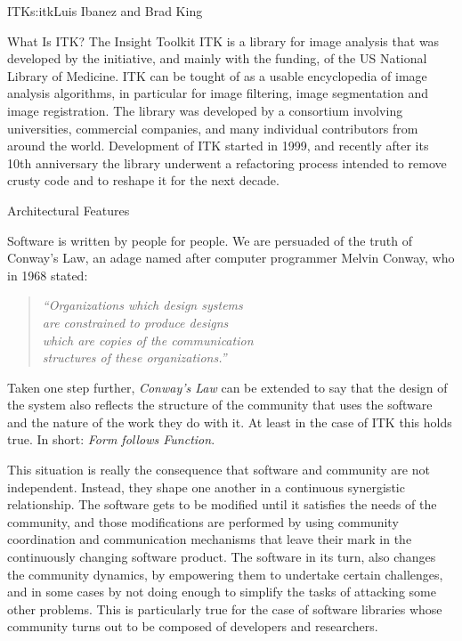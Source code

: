 \begin{aosachapter}{ITK}{s:itk}{Luis Ibanez and Brad King}



\begin{aosasect1}{What Is ITK?}
The Insight Toolkit ITK is a library for image analysis that was developed by
the initiative, and mainly with the funding, of the US National Library of
Medicine. ITK can be tought of as a usable encyclopedia of image analysis
algorithms, in particular for image filtering, image segmentation and image
registration. The library was developed by a consortium involving universities,
commercial companies, and many individual contributors from around the world.
Development of ITK started in 1999, and recently after its 10th anniversary
the library underwent a refactoring process intended to remove crusty code and
to reshape it for the next decade.
\end{aosasect1}

\begin{aosasect1}{Architectural Features}

Software is written by people for people. We are persuaded of the truth of Conway's Law,
an adage named after computer programmer Melvin Conway, who in 1968 stated:

\begin{center}
\begin{quotation}
\emph{
``Organizations which design systems\\
are constrained to produce designs\\
which are copies of the communication\\
structures of these organizations.''
}
\end{quotation}
\end{center}

Taken one step further, \emph{Conway's Law} can be extended to say that the
design of the system also reflects the structure of the community that uses the
software and the nature of the work they do with it. At least in the case of
ITK this holds true. In short: \emph{Form follows Function}.

This situation is really the consequence that software and community are not
independent. Instead, they shape one another in a continuous synergistic
relationship. The software gets to be modified until it satisfies the needs of
the community, and those modifications are performed by using community
coordination and communication mechanisms that leave their mark in the
continuously changing software product. The software in its turn, also changes
the community dynamics, by empowering them to undertake certain challenges, and
in some cases by not doing enough to simplify the tasks of attacking some other
problems. This is particularly true for the case of software libraries whose
community turns out to be composed of developers and researchers.


\end{aosasect1}
\end{aosachapter}

